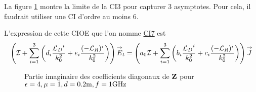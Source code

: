       La figure \ref{fig:imp_fourier:plan:triple_asymptote:hoibc} montre la limite de la CI3 pour capturer 3 asymptotes. Pour cela, il faudrait utiliser une CI d'ordre au moins 6.

      L'expression de cette CIOE que l'on nomme \hyperlink{ci7}{CI7} est
      \begin{equation}
        \left({\mathcal{I}} + \sum_{i=1}^3 \left(d_{i} \dfrac{{\mathcal{L}_D}^i}{k_0^2} + e_{i} \dfrac{(-{\mathcal{L}_R})^i}{k_0^2} \right)\right){\overset{\rightarrow}{E}}_t = \left(a_0 {\mathcal{I}} + \sum_{i=1}^3 \left(b_{i} \dfrac{{\mathcal{L}_D}^i}{k_0^2} + c_{i} \dfrac{(-{\mathcal{L}_R})^i}{k_0^2} \right)\right){\overset{\rightarrow}{J}}
      \end{equation}

      \begin{figure}[!hbt]
          \centering
          
          \caption[CIOE sur empilement avec triple asymptote]{Partie imaginaire des coefficients diagonaux de \(\mathbf{Z}\) pour \(\epsilon = 4, \mu = 1, d=0.2\text{m}, f=1\text{GHz}\)}
          \label{fig:imp_fourier:plan:triple_asymptote:hoibc}
      \end{figure}
